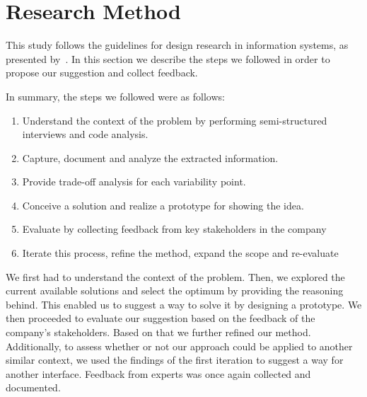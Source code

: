\section{Research Method}

This study follows the guidelines for design research in information systems, as presented by~\cite{Hevner2004}. %
In this section we describe the steps we followed in order to propose our suggestion and collect feedback. 

In summary, the steps we followed were as follows: 
 \begin{enumerate}
  \item Understand the context of the problem by performing semi-structured interviews and code analysis.
  \item Capture, document and analyze the extracted information.
  \item Provide trade-off analysis for each variability point.
  \item Conceive a solution and realize a prototype for showing the idea.
  \item Evaluate by collecting feedback from key stakeholders in the company
  \item Iterate this process, refine the method, expand the scope and re-evaluate
 \end{enumerate}

We first had to understand the context of the problem. Then, we explored the current available solutions and select the optimum by providing the reasoning behind. This enabled us to suggest a way to solve it by designing a prototype. We then proceeded to evaluate our suggestion based on the feedback of the company's stakeholders. Based on that we further refined our method. Additionally,  to assess whether or not our approach could be applied to another similar context, we used the findings of the first iteration to suggest a way for another interface. Feedback from experts was once again collected and documented. 

%


